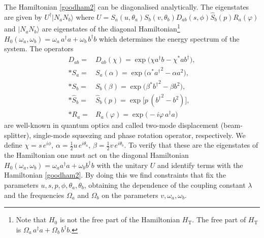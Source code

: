  
 The Hamiltonian \eqref{goodham2} can be diagonalised analytically.  The eigenstates are given by $U^{\dagger}|N_a N_b\rangle$ where $U=S_a(u,\theta_a)  S_b(v,\theta_b)  D_{ab}(s,\phi)\hat S_b(p) R_a(\varphi) $ and $|N_a N_b\rangle$ are eigenstates of the diagonal Hamiltonian\footnote{Note that $H_0$ is not the free part of the Hamiltonian $H_\text{T}$. The free part of $H_\text{T}$ is $\Omega_a\, a^\dagger a+\Omega_b\, b^\dagger b$.}  $H_0(\omega_a,\omega_b)=\omega_a\, a^\dagger a+\omega_b\, b^\dagger b$ which determines the energy spectrum of the system. The operators
\begin{align}
\nonumber D_{ab}=&D_{ab}(\chi)=\exp\big(\chi a^\dagger b - \chi^* a b^\dagger\big),\\*
\nonumber S_a=&S_{a}(\alpha)=\exp\big(\alpha^* {a^\dagger}^2 - \alpha a^2\big),\\*
\nonumber S_b=&S_{b}(\beta)=\exp\big(\beta^* {b^\dagger}^2 - \beta b^2\big),\\*
\nonumber  \hat S_b=&\hat S_{b}(p)=\exp\big[p\, ({b^\dagger}^2 - b^2)\big] ,\\*
R_a=&R_{a}(\varphi)=\exp\big(-i\varphi\, {a^\dagger a}\big)
\end{align}
are well-known in quantum optics  and called two-mode displacement (beam-splitter), single-mode squeezing and phase rotation operator, respectively. We define $\chi=s\,e^{i\phi}$, $\alpha=\frac12u\, e^{i\theta_a}$, $\beta=\frac12 v\,e^{i\theta_b}$.  To verify that these are the eigenstates of the Hamiltonian one must act on the diagonal Hamiltonian $H_0(\omega_a,\omega_b)=\omega_a a^\dagger a + \omega_b b^\dagger b$ with the unitary $U$ and identify terms with the Hamiltonian \eqref{goodham2}. By doing this we find constraints that fix the parameters $u,s,p,\phi,\theta_a,\theta_b$, obtaining the dependence of the coupling constant $\lambda$ and the frequencies  $\Omega_a$ and  $\Omega_b$ on  the parameters $v,\omega_a,\omega_b$. 

